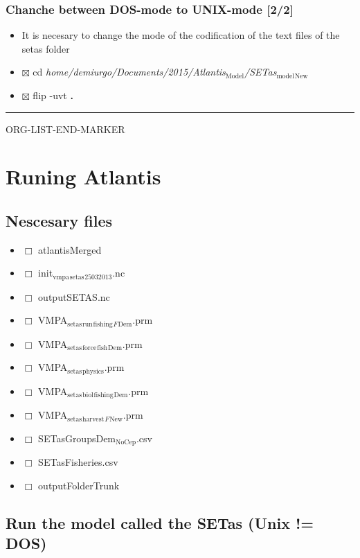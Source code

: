 \documentclass[11pt]{article}
\begin{document}
\subsubsection*{Chanche between DOS-mode to UNIX-mode [2/2]}
\label{sec-1-2-4}

\begin{itemize}
\item It is necesary to change the mode of the codification of the text files of the setas folder
\item $\boxtimes$ cd \emph{home/demiurgo/Documents/2015/Atlantis$_{\mathrm{Model}}$/SETas$_{\mathrm{model}}$$_{\mathrm{New}}$}
\item $\boxtimes$ flip -uvt \textbf{.}
\end{itemize}
\hrule
ORG-LIST-END-MARKER
\section*{Runing Atlantis}
\label{sec-2}
\subsection*{Nescesary files}
\label{sec-2-1}

\begin{itemize}
\item $\Box$ atlantisMerged
\item $\Box$ init$_{\mathrm{vmpa}}$$_{\mathrm{setas}}$$_{\mathrm{25032013}}$.nc
\item $\Box$ outputSETAS.nc
\item $\Box$ VMPA$_{\mathrm{setas}}$$_{\mathrm{run}}$$_{\mathrm{fishing}}$$_F$$_{\mathrm{Dem}}$.prm
\item $\Box$ VMPA$_{\mathrm{setas}}$$_{\mathrm{force}}$$_{\mathrm{fish}}$$_{\mathrm{Dem}}$.prm
\item $\Box$ VMPA$_{\mathrm{setas}}$$_{\mathrm{physics}}$.prm
\item $\Box$ VMPA$_{\mathrm{setas}}$$_{\mathrm{biol}}$$_{\mathrm{fishing}}$$_{\mathrm{Dem}}$.prm
\item $\Box$ VMPA$_{\mathrm{setas}}$$_{\mathrm{harvest}}$$_F$$_{\mathrm{New}}$.prm
\item $\Box$ SETasGroupsDem$_{\mathrm{NoCep}}$.csv
\item $\Box$ SETasFisheries.csv
\item $\Box$ outputFolderTrunk
\end{itemize}
\subsection*{Run the model called the SETas (Unix != DOS)}
\label{sec-2-2}
\end{document}
